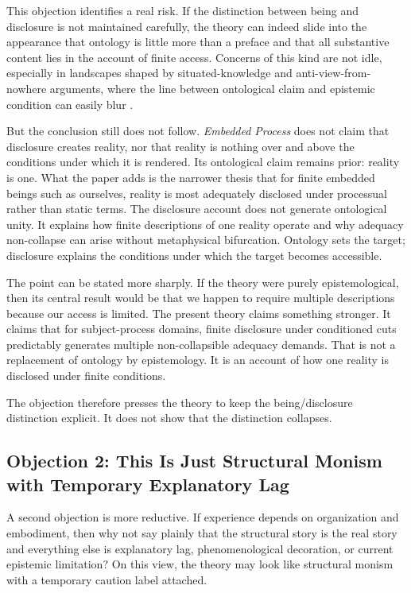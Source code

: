 \documentclass[11pt]{article}
\renewcommand{\emph}[1]{\textit{#1}}
\begin{document}
This objection identifies a real risk. If the distinction between being and disclosure is not maintained carefully, the theory can indeed slide into the appearance that ontology is little more than a preface and that all substantive content lies in the account of finite access. Concerns of this kind are not idle, especially in landscapes shaped by situated-knowledge and anti-view-from-nowhere arguments, where the line between ontological claim and epistemic condition can easily blur \cite{Haraway1988,Nagel1986}.

But the conclusion still does not follow. \emph{Embedded Process} does not claim that disclosure creates reality, nor that reality is nothing over and above the conditions under which it is rendered. Its ontological claim remains prior: reality is one. What the paper adds is the narrower thesis that for finite embedded beings such as ourselves, reality is most adequately disclosed under processual rather than static terms. The disclosure account does not generate ontological unity. It explains how finite descriptions of one reality operate and why adequacy non-collapse can arise without metaphysical bifurcation. Ontology sets the target; disclosure explains the conditions under which the target becomes accessible.

The point can be stated more sharply. If the theory were purely epistemological, then its central result would be that we happen to require multiple descriptions because our access is limited. The present theory claims something stronger. It claims that for subject-process domains, finite disclosure under conditioned cuts predictably generates multiple non-collapsible adequacy demands. That is not a replacement of ontology by epistemology. It is an account of how one reality is disclosed under finite conditions.

The objection therefore presses the theory to keep the being/disclosure distinction explicit. It does not show that the distinction collapses.

\subsection{Objection 2: This Is Just Structural Monism with Temporary Explanatory Lag}

A second objection is more reductive. If experience depends on organization and embodiment, then why not say plainly that the structural story is the real story and everything else is explanatory lag, phenomenological decoration, or current epistemic limitation? On this view, the theory may look like structural monism with a temporary caution label attached.
\end{document}
